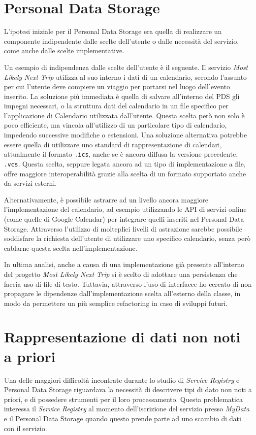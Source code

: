 \section{Personal Data Storage}
\label{sec:A-PDS}
L’ipotesi iniziale per il Personal Data Storage era quella di realizzare un componente indipendente dalle scelte dell’utente o dalle necessit\`a del servizio, come anche dalle scelte implementative. 

Un esempio di indipendenza dalle scelte dell’utente \`e il seguente. Il servizio \textit{Most Likely Next Trip} utilizza al suo interno i dati di un calendario, secondo l’assunto per cui l’utente deve compiere un viaggio per portarsi nel luogo dell’evento inserito. La soluzione pi\`u immediata \`e quella di salvare all’interno del PDS gli impegni necessari, o la struttura dati del calendario in un file specifico per l’applicazione di Calendario utilizzata dall’utente. Questa scelta per\`o non solo \`e poco efficiente, ma vincola all’utilizzo di un particolare tipo di calendario, impedendo successive modifiche o estensioni. Una soluzione alternativa potrebbe essere quella di utilizzare uno standard di rappresentazione di calendari, attualmente il formato \texttt{.ics}, anche se \`e ancora diffusa la versione precedente, \texttt{.vcs}. Questa scelta, seppure legata ancora ad un tipo di implementazione a file, offre maggiore interoperabilit\`a grazie alla scelta di un formato supportato anche da servizi esterni.

Alternativamente, \`e possibile astrarre ad un livello ancora maggiore l’implementazione del calendario, ad esempio utilizzando le API di servizi online (come quelle di Google Calendar\cite{googlecalendarapi}) per integrare quelli inseriti nel Personal Data Storage. Attraverso l’utilizzo di molteplici livelli di astrazione sarebbe possibile soddisfare la richiesta dell’utente di utilizzare uno specifico calendario, senza per\`o cablarne questa scelta nell’implementazione.

In ultima analisi, anche a causa di una implementazione gi\`a presente all’interno del progetto \textit{Most Likely Next Trip} si \`e scelto di adottare una persistenza che faccia uso di file di testo. Tuttavia, attraverso l’uso di interfacce ho cercato di non propagare le dipendenze dall’implementazione scelta all’esterno della classe, in modo da permettere un pi\`u semplice refactoring in caso di sviluppi futuri.

\section{Rappresentazione di dati non noti a priori}
\label{sec:A-datinonnotiapriori}
Una delle maggiori difficolt\`a incontrate durante lo studio di \textit{Service Registry} e Personal Data Storage riguardava la necessit\`a di descrivere tipi di dato non noti a priori, e di possedere strumenti per il loro processamento. Questa problematica interessa il \textit{Service Registry} al momento dell’iscrizione del servizio presso \textit{MyData} e il Personal Data Storage quando questo prende parte ad uno scambio di dati con il servizio.

